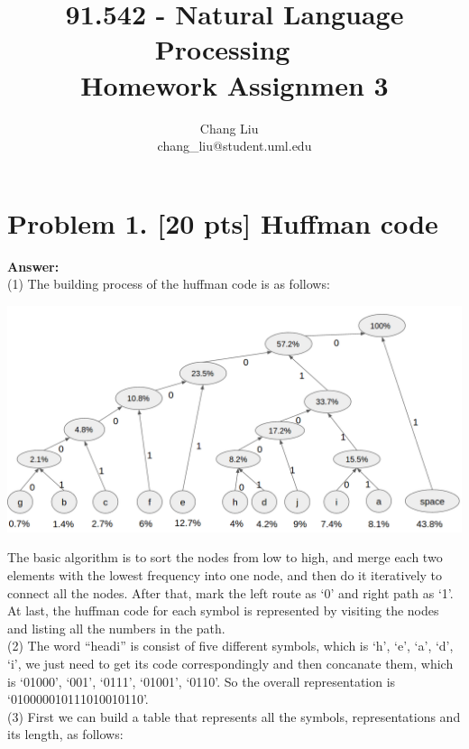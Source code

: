 \documentclass{article}
\title{91.542 - Natural Language Processing ~\\ Homework Assignmen 3}
\author{Chang Liu ~\\ chang\_liu@student.uml.edu}
\begin{document}
\maketitle


\section{Problem 1. [20 pts] Huffman code}

\textbf{Answer:}~\\
(1) The building process of the huffman code is as follows:

\begin{center}
\includegraphics[scale=0.3]{hw3_fig1.png}
\end{center}

The basic algorithm is to sort the nodes from low to high, and merge each two elements with the lowest frequency into one node, and then do it iteratively to connect all the nodes. After that, mark the left route as `0' and right path as `1'. At last, the huffman code for each symbol is represented by visiting the nodes and listing all the numbers in the path.~\\


(2) The word ``headi'' is consist of five different symbols, which is `h', `e', `a', `d', `i', we just need to get its code correspondingly and then concanate them, which is `01000', `001', `0111', `01001', `0110'. So the overall representation is `010000010111010010110'. ~\\

(3) First we can build a table that represents all the symbols, representations and its length, as follows:
\end{document}
